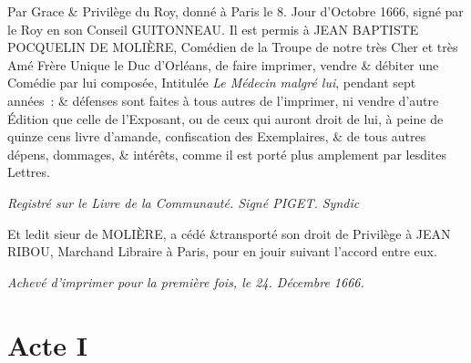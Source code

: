 \documentclass[french,twoside]{book} %
\begin{document}
\noindent Par Grace \& Privilège du Roy, donné à Paris le 8. Jour d’Octobre 1666, signé par le Roy en son Conseil GUITONNEAU. Il est permis à JEAN BAPTISTE POCQUELIN DE MOLIÈRE, Comédien de la Troupe de notre très Cher et très Amé Frère Unique le Duc d’Orléans, de faire imprimer, vendre \& débiter une Comédie par lui composée, Intitulée \emph{Le Médecin malgré lui}, pendant sept années : \& défenses sont faites à tous autres de l’imprimer, ni vendre d’autre Édition que celle de l’Exposant, ou de ceux qui auront droit de lui, à peine de quinze cens livre d’amande, confiscation des Exemplaires, \& de tous autres dépens, dommages, \& intérêts, comme il est porté plus amplement par lesdites Lettres.\par
{\itshape Registré sur le Livre de la Communauté. Signé PIGET. Syndic}\par
Et ledit sieur de MOLIÈRE, a cédé \&transporté son droit de Privilège à JEAN RIBOU, Marchand Libraire à Paris, pour en jouir suivant l’accord entre eux.\par
{\itshape Achevé d’imprimer pour la première fois, le 24. Décembre 1666.}
\mainmatter \section[{Acte I}]{Acte I}
\label{I}\renewcommand{\leftmark}{Acte I}
\end{document}
